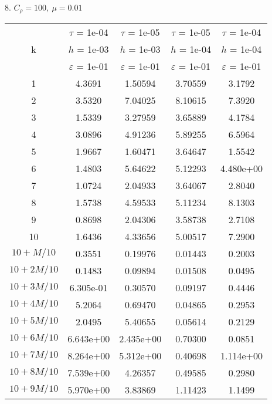 8. $C_{\rho} = 100, \ \mu = 0.01$
\begin{center}
	\begin{tabular}{ |c|c|c|c|c| } 
		\hline
		& $\tau$ = 1e-04 & $\tau$ = 1e-05 & $\tau$ = 1e-05 & $\tau$ = 1e-04 \\ 
		k & $h$ = 1e-03 & $h$ = 1e-03 & $h$ = 1e-04 & $h$ = 1e-04 \\ 
		& $\varepsilon$ = 1e-01 & $\varepsilon$ = 1e-01 & $\varepsilon$ = 1e-01 & $\varepsilon$ = 1e-01 \\ 
		\hline
		1 & 4.3691 & 1.50594 & 3.70559 & 3.1792 \\
		\hline
		2 & 3.5320 & 7.04025 & 8.10615 & 7.3920 \\
		\hline
		3 & 1.5339 & 3.27959 & 3.65889 & 4.1784 \\
		\hline
		4 & 3.0896 & 4.91236 & 5.89255 & 6.5964 \\
		\hline
		5 & 1.9667 & 1.60471 & 3.64647 & 1.5542 \\
		\hline
		6 & 1.4803 & 5.64622 & 5.12293 & 4.480e+00 \\
		\hline
		7 & 1.0724 & 2.04933 & 3.64067 & 2.8040 \\
		\hline
		8 & 1.5738 & 4.59533 & 5.11234 & 8.1303 \\
		\hline
		9 & 0.8698 & 2.04306 & 3.58738 & 2.7108 \\
		\hline
		10 & 1.6436 & 4.33656 & 5.00517 & 7.2900 \\
		\hline
		$10 + M/10$ & 0.3551 & 0.19976 & 0.01443 & 0.2003 \\
		\hline
		$10 + 2M/10$ & 0.1483 & 0.09894 & 0.01508 & 0.0495 \\
		\hline
		$10 + 3M/10$ & 6.305e-01 & 0.30570 & 0.09197 & 0.4446 \\
		\hline
		$10 + 4M/10$ & 5.2064 & 0.69470 & 0.04865 & 0.2953 \\
		\hline
		$10 + 5M/10$ & 2.0495 & 5.40655 & 0.05614 & 0.2129 \\
		\hline
		$10 + 6M/10$ & 6.643e+00 & 2.435e+00 & 0.70300 & 0.0851 \\
		\hline
		$10 + 7M/10$ & 8.264e+00 & 5.312e+00 & 0.40698 & 1.114e+00 \\
		\hline
		$10 + 8M/10$ & 7.539e+00 & 4.26357 & 0.49585 & 0.2980 \\
		\hline
		$10 + 9M/10$ & 5.970e+00 & 3.83869 & 1.11423 & 1.1499 \\
		\hline
	\end{tabular}
\end{center}

